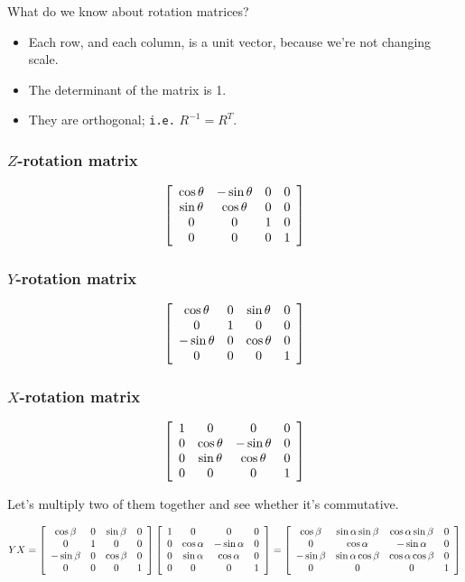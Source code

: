 \documentclass[11pt]{article}
\begin{document}
\begin{spacing}{1.2}
What do we know about rotation matrices?

\begin{itemize}
	\item Each row, and each column, is a unit vector, because we're not changing scale.
	\item The determinant of the matrix is 1.
	\item They are orthogonal; {\tt i.e.} $R^{-1} = R^T$.
\end{itemize}

\subsubsection{$Z$-rotation matrix}

$$
\left[
\begin{array}{cccc}
	\cos \theta & - \sin \theta & 0 & 0 \cr
	\sin \theta & \cos \theta & 0 & 0 \cr
	0 & 0 & 1 & 0 \cr
	0 & 0 & 0 & 1 \cr
\end{array}
\right]
$$

\subsubsection{$Y$-rotation matrix}

$$
\left[
\begin{array}{cccc}
	\cos \theta & 0 & \sin \theta & 0 \cr
	0 & 1 & 0 & 0 \cr
	-\sin \theta & 0  & \cos \theta & 0 \cr
	0 & 0 & 0 & 1 \cr
\end{array}
\right]
$$

\subsubsection{$X$-rotation matrix}

$$
\left[
\begin{array}{cccc}
	1 & 0 & 0 & 0 \cr
	0 & \cos \theta & -\sin \theta & 0 \cr
	0 & \sin \theta & \cos \theta & 0 \cr
	0 & 0 & 0 & 1 \cr
\end{array}
\right]
$$

Let's multiply two of them together and see whether it's commutative.  

$$YX = 
\left[
\begin{array}{cccc}
	\cos \beta & 0 & \sin \beta & 0 \cr
	0 & 1 & 0 & 0 \cr
	-\sin \beta & 0  & \cos \beta & 0 \cr
	0 & 0 & 0 & 1 \cr
\end{array}
\right]
\left[
\begin{array}{cccc}
	1 & 0 & 0 & 0 \cr
	0 & \cos \alpha & -\sin \alpha & 0 \cr
	0 & \sin \alpha & \cos \alpha & 0 \cr
	0 & 0 & 0 & 1 \cr
\end{array}
\right]
=\left[
\begin{array}{cccc}
	\cos \beta & \sin \alpha \sin \beta & \cos \alpha \sin \beta & 0 \cr
	0 & \cos \alpha & -\sin \alpha & 0 \cr
	-\sin \beta & \sin \alpha \cos \beta & \cos \alpha \cos \beta & 0 \cr
	0 & 0 & 0 & 1 \cr
\end{array}
\right]
$$


\end{spacing}
\end{document}
